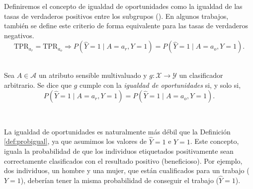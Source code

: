 \documentclass[oneside,openright,titlepage,numbers=noenddot,openany,headinclude,footinclude=true,
cleardoublepage=empty,abstractoff,BCOR=5mm,paper=a4,fontsize=12pt,main=spanish]{scrreprt}
\begin{document}

Definiremos el concepto de igualdad de oportunidades como la igualdad de las tasas de verdaderos positivos entre los subgrupos (\cite{eodd2016}). En algunos trabajos, también se define este criterio de forma equivalente para las tasas de verdaderos negativos.
\begin{equation*}
\text{TPR}_{a_r}=\text{TPR}_{a_o} \Rightarrow P(\hat{Y}= 1 \mid A=a_r, Y=1)=P(\hat{Y}= 1 \mid A=a_o, Y=1).
\end{equation*}\

\begin{definition}
Sea $A \in \mathcal{A}$ un atributo sensible multivaluado y $g\colon \mathcal{X} \to \mathcal{Y}$ un clasificador arbitrario. Se dice que $g$ cumple con la \textit{igualdad de oportunidades} si, y solo si, $$P(\hat{Y}=1 \mid A=a_r,Y=1)=P(\hat{Y}=1 \mid A=a_o, Y=1).$$
\end{definition}\

La igualdad de oportunidades es naturalmente más débil que la Definición \ref{def:probigual}, ya que asumimos los valores de $\hat{Y}=1$ e $Y=1$. Este concepto, iguala la probabilidad de que los individuos etiquetados positivamente
sean correctamente clasificados con el resultado positivo (beneficioso). Por ejemplo, dos individuos, un
hombre y una mujer, que están cualificados para un trabajo ($Y=1$), deberían tener la misma probabilidad de conseguir el trabajo ($\hat{Y}=1$).
\end{document}
